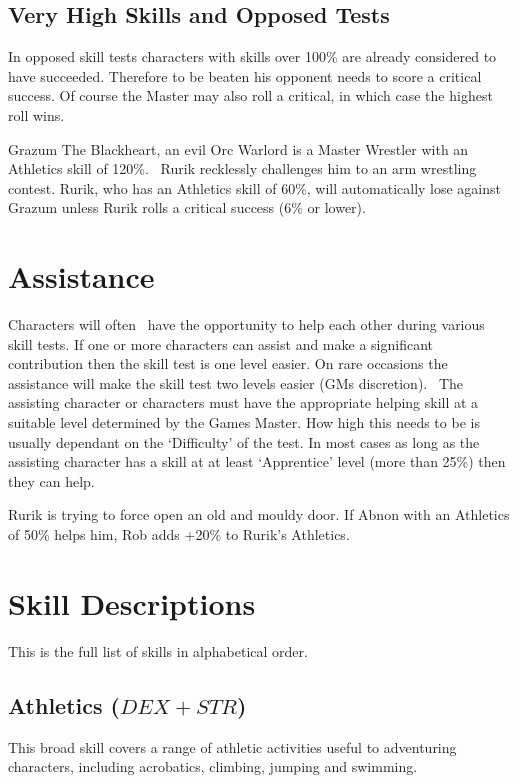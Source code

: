 \subsection{Very High Skills and Opposed Tests}
In opposed skill tests characters with skills over 100\% are already considered to have succeeded. Therefore to be beaten his opponent needs to score a critical success. Of course the Master may also roll a critical, in which case the highest roll wins.


\begin{rpg-examplebox}
Grazum The Blackheart, an evil Orc Warlord is a Master Wrestler with an Athletics skill of 120\%.  Rurik recklessly challenges him to an arm wrestling contest. Rurik, who has an Athletics skill of 60\%, will automatically lose against Grazum unless Rurik rolls a critical success (6\% or lower).
\end{rpg-examplebox}

\section{Assistance}
Characters will often  have the opportunity to help each other during various skill tests. If one or more characters can assist and make a significant contribution then the skill test is one level easier. On rare occasions the assistance will make the skill test two levels easier (GMs discretion).  The assisting character or characters must have the appropriate helping skill at a suitable level determined by the Games Master. How high this needs to be is usually dependant on the ‘Difficulty’ of the test. In most cases as long as the assisting character has a skill at at least ‘Apprentice’ level (more than 25\%) then they can help.

\begin{rpg-examplebox}
Rurik is trying to force open an old and mouldy door. If Abnon with an Athletics of 50\% helps him, Rob adds +20\% to Rurik’s Athletics.
\end{rpg-examplebox}


\section{Skill Descriptions}
This is the full list of skills in alphabetical order.

\subsection{Athletics ($DEX+STR$)}
This broad skill covers a range of athletic activities useful to adventuring characters, including acrobatics, climbing, jumping and swimming. 

